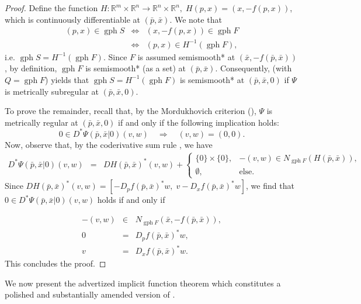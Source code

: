\documentclass[reqno]{amsart}
\numberwithin{equation}{section}
\newcommand{\R}{\mathbb{R}}
\newcommand{\gph}{\operatorname{gph}}
\begin{document}
\begin{proof} Define the function $H:\R^m \times \R^n \to \R^n \times \R^n,\; H(p,x)=(x,-f(p,x))$, which is continuously differentiable at $(\bar p,\bar x)$. We note that 
\begin{eqnarray*}
(p,x)\in \gph S & \Longleftrightarrow & (x,-f(p,x)) \in \gph F\\
& \Longleftrightarrow & (p,x) \in H^{-1}(\gph F),
\end{eqnarray*}
i.e. $\gph S=H^{-1}(\gph F)$. 
Since $F$ is assumed  semismooth* at $(\bar x,-f(\bar p,\bar x))$, by definition, $\gph F$ is semismooth* (as a set) at $(\bar p,\bar x)$. Consequently,  (with $Q=\gph F$) yields that $\gph S=H^{-1}(\gph F)$ is semismooth* at $(\bar p,\bar x,0)$ if $\Psi$ is metrically subregular at $(\bar p,\bar x,0)$. 

To prove the remainder,  recall that, by the Mordukhovich criterion (),   $\Psi$ is metrically regular at $(\bar p,\bar x,0)$ if and only if the following implication holds: 
\begin{equation}
0\in D^*\Psi(\bar p,\bar x|0)(v,w) \quad \Longrightarrow \quad (v,w)=(0,0).
\end{equation}
Now, observe that, by the coderivative sum rule , we have 
\begin{eqnarray*}
D^*\Psi(\bar p,\bar x|0)(v,w) & = & DH(\bar p,\bar x)^*(v,w)+\begin{cases} \{0\}\times \{0\}, &-(v,w) \in N_{\gph F}(H(\bar p,\bar x)),\\ \emptyset, & \text{else}.\end{cases}
\end{eqnarray*}
Since $DH(\bar p,\bar x)^*(v,w)=[-D_pf(\bar p,\bar x)^*w, \; v-D_xf(\bar p,\bar x)^*w]$, we find that  $0\in D^*\Psi(\bar p,\bar x|0)(v,w)$ holds if and only if

\begin{equation}
\begin{array}{rcl}
-(v,w)&\in &N_{\gph F}(\bar x,-f(\bar p,\bar x)),\\
0 & = & D_pf(\bar p,\bar x)^*w,\\
v & = & D_xf(\bar p,\bar x)^*w.
\end{array}
\end{equation}
This concludes the proof.
\end{proof}

\noindent 
 We now present the  advertized implicit function theorem which constitutes a polished and substantially amended version of   \cite[Proposition 4.11]{BBH 22}.
\end{document}
